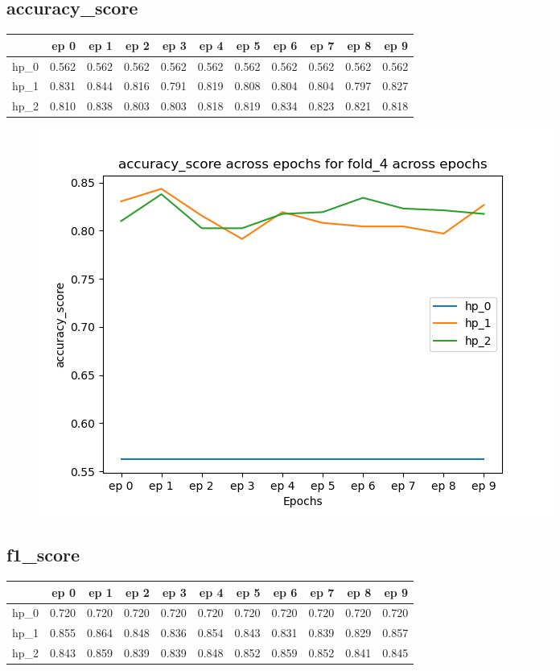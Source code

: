 \documentclass{article}
\begin{document}
\subsection{accuracy\_score}
\begin{tabular}{lrrrrrrrrrr}
\toprule
{} &   ep 0 &   ep 1 &   ep 2 &   ep 3 &   ep 4 &   ep 5 &   ep 6 &   ep 7 &   ep 8 &   ep 9 \\
\midrule
hp\_0 &  0.562 &  0.562 &  0.562 &  0.562 &  0.562 &  0.562 &  0.562 &  0.562 &  0.562 &  0.562 \\
hp\_1 &  0.831 &  0.844 &  0.816 &  0.791 &  0.819 &  0.808 &  0.804 &  0.804 &  0.797 &  0.827 \\
hp\_2 &  0.810 &  0.838 &  0.803 &  0.803 &  0.818 &  0.819 &  0.834 &  0.823 &  0.821 &  0.818 \\
\bottomrule
\end{tabular}

\begin{figure}[H]
\includegraphics[scale = 0.75]{fold_4/accuracy_score}
\end{figure}
\subsection{f1\_score}
\begin{tabular}{lrrrrrrrrrr}
\toprule
{} &   ep 0 &   ep 1 &   ep 2 &   ep 3 &   ep 4 &   ep 5 &   ep 6 &   ep 7 &   ep 8 &   ep 9 \\
\midrule
hp\_0 &  0.720 &  0.720 &  0.720 &  0.720 &  0.720 &  0.720 &  0.720 &  0.720 &  0.720 &  0.720 \\
hp\_1 &  0.855 &  0.864 &  0.848 &  0.836 &  0.854 &  0.843 &  0.831 &  0.839 &  0.829 &  0.857 \\
hp\_2 &  0.843 &  0.859 &  0.839 &  0.839 &  0.848 &  0.852 &  0.859 &  0.852 &  0.841 &  0.845 \\
\bottomrule
\end{tabular}
\end{document}
